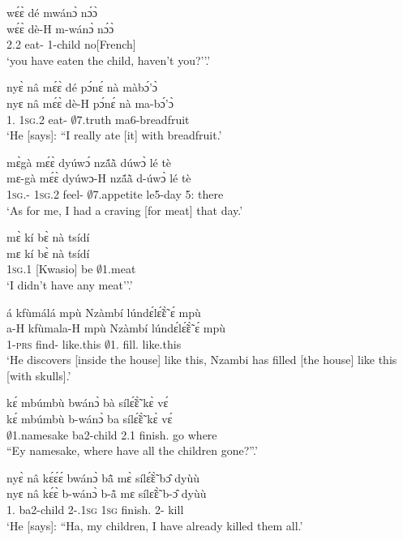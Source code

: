 \begin{exe}[(N234)]
\exN\label{n125}
  \glll wɛ́ɛ̀ dé mwánɔ̀ nɔ́ɔ̀ \\
       wɛ́ɛ̀ dè-H m-wánɔ̀ nɔ́ɔ̀ \\
      2.{\PST}2 eat-{\R} {\N}1-child no[French] \\
    \trans `you  have eaten
     the child, haven't you?''.'
 
\exN\label{n126}
  \glll nyɛ̀ nâ mɛ́ɛ̀ dé pɔ́nɛ́ nà màbɔ́'ɔ̀ \\
        nyɛ nâ mɛ́ɛ̀ dè-H pɔ́nɛ́ nà ma-bɔ́'ɔ̀ \\
      1.{\SBJ}  {\COMP} 1\textsc{sg}.{\PST}2 eat-{\R} $\emptyset$7.truth {\COM} ma6-breadfruit   \\
    \trans `He [says]: ``I really ate [it] with breadfruit.'
 
\exN\label{n127} 
  \glll mɛ̀gà mɛ́ɛ̀ dyúwɔ́ nzã́ã̀ dúwɔ̀ lé tè \\
       mɛ-gà mɛ́ɛ̀ dyúwɔ-H nzã́ã̀ d-úwɔ̀ lé tè \\
         1\textsc{sg}.{\SBJ}-{\CONTR} 1\textsc{sg}.{\PST}2 feel-{\R} $\emptyset$7.appetite le5-day 5:{\ATT}  there \\
    \trans `As for me, I had a craving [for meat] that day.'
 
\exN\label{n128}
  \glll mɛ̀ kí bɛ̀ nà tsídí \\
       mɛ kí bɛ̀ nà tsídí \\
       1\textsc{sg}.{\PST}1 {\NEG}[Kwasio] be {\COM} $\emptyset$1.meat  \\
    \trans `I didn't have any meat''.'
 
\exN\label{n129}
  \glll á kfùmálá mpù Nzàmbí lúndɛ́lɛ̃́ɛ̃̀ ɛ́ mpù \\
        a-H kfùmala-H mpù Nzàmbí lúndɛ́lɛ̃́ɛ̃̀ ɛ́ mpù \\
        1-\textsc{prs} find-{\R} like.this $\emptyset$1.{\PN} fill.{\COMPL} {\LOC} like.this \\
    \trans `He discovers [inside the house] like this, Nzambi has filled [the house] like this [with skulls].'
 
\exN\label{n130}
  \glll kɛ́ mbúmbù bwánɔ̀ bà sílɛ̃́ɛ̃̀ kɛ̀ vɛ́ \\
       kɛ́ mbúmbù b-wánɔ̀ ba sílɛ̃́ɛ̃̀ kɛ̀ vɛ́ \\
        {\EXCL} $\emptyset$1.namesake ba2-child 2.{\PST}1 finish.{\COMPL} go where \\
    \trans ``Ey namesake, where have all the children gone?''.'
 
\exN\label{n131}
  \glll  nyɛ̀ nâ kɛ́ɛ́ɛ́ bwánɔ̀ bã̂ mɛ̀ sílɛ̃́ɛ̃̀ bɔ̂ dyùù\\
        nyɛ nâ kɛ́ɛ̀ b-wánɔ̀ b-ã̊ mɛ sílɛ̃ɛ̃̀ b-ɔ̂ dyùù\\
        1.{\SBJ}  {\COMP} {\EXCL} ba2-child 2-{\POSS}.1\textsc{sg} 1\textsc{sg} finish.{\COMPL} 2-{\OBJ} kill\\
    \trans `He [says]: ``Ha, my children, I have already killed them all.'
 

\end{exe}
